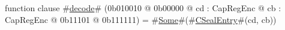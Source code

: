 function clause #\hyperref[zdecode]{decode}# (0b010010 @ 0b00000 @ cd : CapRegEnc @ cb : CapRegEnc @    0b11101 @ 0b111111) = #\hyperref[zSome]{Some}#(#\hyperref[zCSealEntry]{CSealEntry}#(cd, cb))
